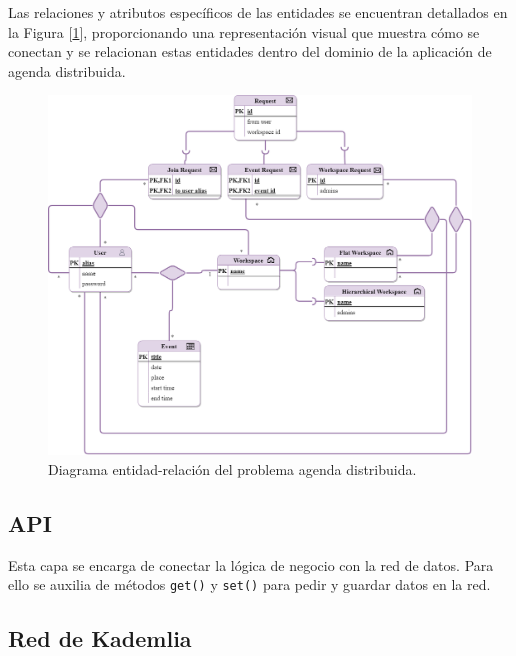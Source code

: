 \documentclass[10pt]{article} %
\begin{document}
	Las relaciones y atributos específicos de las entidades  se encuentran detallados en la Figura [\ref{merx}], proporcionando una representación visual que muestra cómo se conectan y se relacionan estas entidades dentro del dominio de la aplicación de agenda distribuida.
	


	\begin{center}
		\begin{figure}[h]
			\includegraphics[scale=0.35]{modelo-merx}
			\caption{Diagrama entidad-relaci\'on del problema agenda distribuida.}
			\label{merx}
		\end{figure}
		
	\end{center}

	 
	

	
	\subsection{API}
	
	Esta capa se encarga de conectar la l\'ogica de negocio con la red de datos. Para ello se auxilia de m\'etodos \texttt{get()} y \texttt{set()} para pedir y guardar datos en la red.
	
	\subsection{Red de Kademlia}
	
\end{document}
